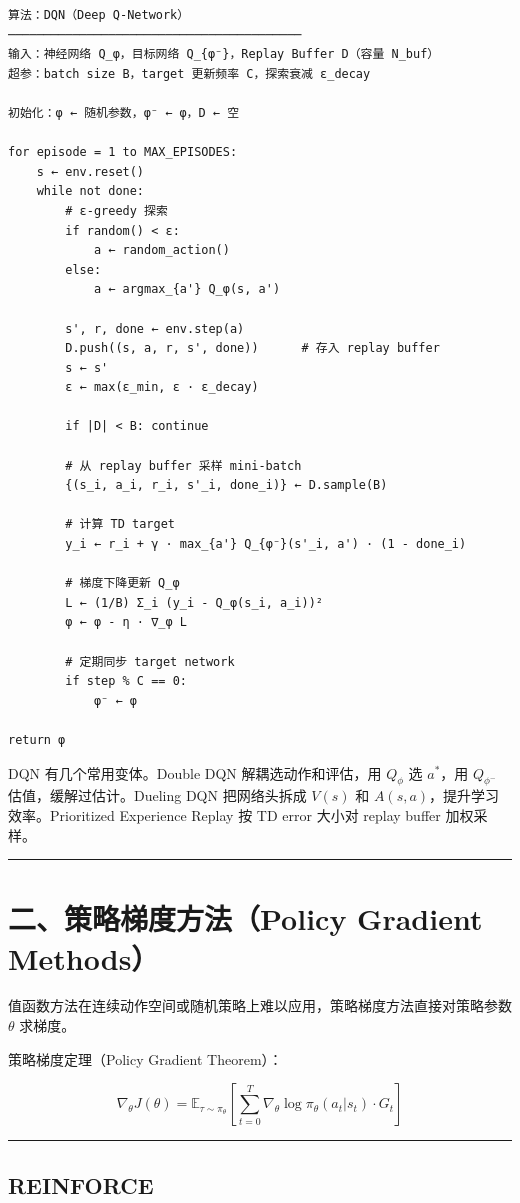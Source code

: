 \begin{verbatim}
算法：DQN（Deep Q-Network）
─────────────────────────────────────────
输入：神经网络 Q_φ，目标网络 Q_{φ⁻}，Replay Buffer D（容量 N_buf）
超参：batch size B，target 更新频率 C，探索衰减 ε_decay

初始化：φ ← 随机参数，φ⁻ ← φ，D ← 空

for episode = 1 to MAX_EPISODES:
    s ← env.reset()
    while not done:
        # ε-greedy 探索
        if random() < ε:
            a ← random_action()
        else:
            a ← argmax_{a'} Q_φ(s, a')
        
        s', r, done ← env.step(a)
        D.push((s, a, r, s', done))      # 存入 replay buffer
        s ← s'
        ε ← max(ε_min, ε · ε_decay)
        
        if |D| < B: continue
        
        # 从 replay buffer 采样 mini-batch
        {(s_i, a_i, r_i, s'_i, done_i)} ← D.sample(B)
        
        # 计算 TD target
        y_i ← r_i + γ · max_{a'} Q_{φ⁻}(s'_i, a') · (1 - done_i)
        
        # 梯度下降更新 Q_φ
        L ← (1/B) Σ_i (y_i - Q_φ(s_i, a_i))²
        φ ← φ - η · ∇_φ L
        
        # 定期同步 target network
        if step % C == 0:
            φ⁻ ← φ

return φ
\end{verbatim}

DQN 有几个常用变体。Double DQN 解耦选动作和评估，用 \(Q_\phi\) 选 \(a^*\)，用 \(Q_{\phi^-}\) 估值，缓解过估计。Dueling DQN 把网络头拆成 \(V(s)\) 和 \(A(s,a)\)，提升学习效率。Prioritized Experience Replay 按 TD error 大小对 replay buffer 加权采样。

\hrule

\section{二、策略梯度方法（Policy Gradient Methods）}

值函数方法在连续动作空间或随机策略上难以应用，策略梯度方法直接对策略参数 \(\theta\) 求梯度。

策略梯度定理（Policy Gradient Theorem）：

\[
\nabla_\theta J(\theta) = \mathbb{E}_{\tau \sim \pi_\theta}\left[\sum_{t=0}^T \nabla_\theta \log \pi_\theta(a_t|s_t) \cdot G_t\right]
\]

\hrule

\subsection{REINFORCE}

